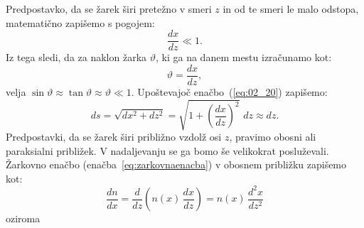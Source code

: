 Predpostavko, da se žarek širi pretežno v smeri $z$ in od te smeri 
le malo odstopa, matematično zapišemo s pogojem:
\begin{equation}
 \frac{dx}{dz}\ll 1.
  \label{eq:02_20}
\end{equation}
Iz tega sledi, da za naklon žarka $\vartheta$, ki ga na danem mestu izračunamo kot:
\begin{equation}
\vartheta = \frac{dx}{dz},
 \label{eq:02_21}
\end{equation}
velja $\sin \vartheta \approx \tan \vartheta \approx \vartheta \ll 1$.
Upoštevajoč enačbo~(\ref{eq:02_20}) zapišemo:
\begin{equation}
ds = \sqrt{dx^2+dz^2} = \sqrt{1+\left(\frac{dx}{dz}\right)^2}\,\,dz \approx dz.
\label{eq:02_22}
\end{equation}
Predpostavki, da se žarek širi približno vzdolž osi $z$, pravimo
obosni ali paraksialni približek. V nadaljevanju se ga bomo še velikokrat 
posluževali. Žarkovno enačbo (enačba~\ref{eq:zarkovnaenacba}) v obosnem 
približku
zapišemo kot:
\begin{equation}
 \frac{dn}{dx} = \frac{d}{dz}\left(n(x)\,\frac{dx}{dz}\right) = n(x)\,\frac{d^2x}{dz^2}
  \label{eq:02_23}
\end{equation}
oziroma


